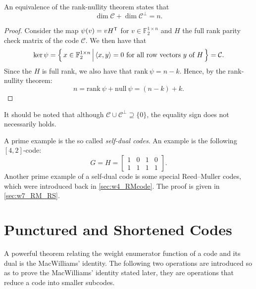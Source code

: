 \begin{theorem} 
    An equivalence of the rank-nullity theorem states that
    \begin{equation}
        \dim\mathcal{C} + \dim\mathcal{C}^\perp = n. \label{eq:w6_rank-nullity}
    \end{equation}
\end{theorem}
\begin{proof}
    Consider the map $\psi(v)=vH^{\mathsf{T}}$ for $v\in\mathbb{F}_2^{1\times n}$ and $H$ the full rank parity check matrix of the code $\mathcal{C}$. We then have that
    \begin{equation*}
        \ker\psi = \left\{\,{x\in\mathbb{F}_2^{1\times n}}\,\middle\vert\,{\langle x,y\rangle=0 \text{ for all row vectors }y \text{ of }H}\,\right\} = \mathcal{C}.
    \end{equation*}
    Since the $H$ is full rank, we also have that $\mathrm{rank}~\psi=n-k$. Hence, by the rank-nullity theorem:
    \begin{equation*}
        n = \mathrm{rank}~\psi + \mathrm{null}~\psi = (n-k) + k.
    \end{equation*}
\end{proof}

\begin{remark} \label{rmk:w6_RM_self_dual}
    It should be noted that although $\mathcal{C}\cup \mathcal{C}^\perp \supseteq \{0\}$, the equality sign does not necessarily holds.

    A prime example is the so called \textit{self-dual codes}. An example is the following $[4,2]$-code:
    \begin{equation*}
        G = H = \left[\begin{matrix}
            1 & 0 & 1 & 0 \\ 1 & 1 & 1 & 1
        \end{matrix}\right].
    \end{equation*}
    Another prime example of a self-dual code is some special Reed--Muller codes, which were introduced back in \autoref{sec:w4_RMcode}. The proof is given in \autoref{sec:w7_RM_RS}.
\end{remark}

\section{Punctured and Shortened Codes}
A powerful theorem relating the weight enumerator function of a code and its dual is the MacWilliams' identity. The following two operations are introduced so as to prove the MacWilliams' identity stated later, they are operations that reduce a code into smaller subcodes.

